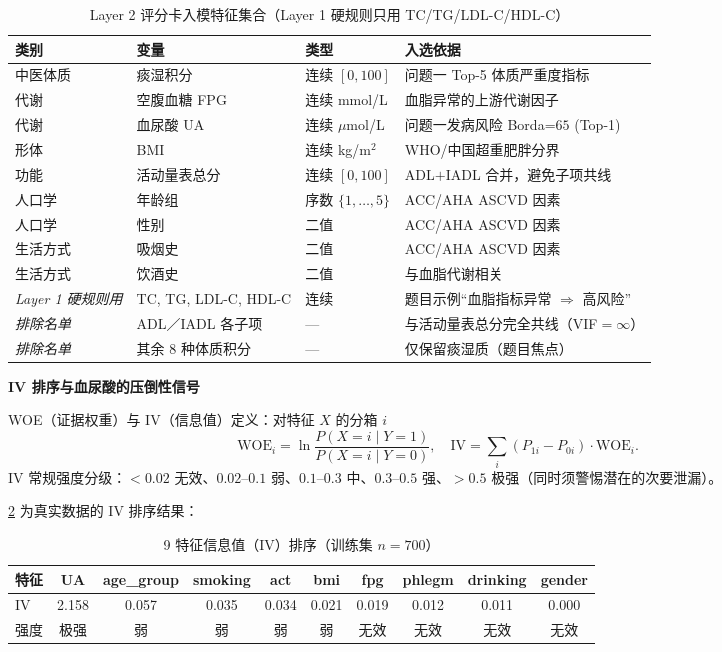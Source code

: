 \documentclass{MathorCupmodeling}
\begin{document}
\begin{table}[H]
\centering\small
\caption{Layer 2 评分卡入模特征集合（Layer 1 硬规则只用 TC/TG/LDL-C/HDL-C）}\label{tab:q2-features}
\begin{tabular}{@{}l l l l@{}}
\toprule
类别 & 变量 & 类型 & 入选依据 \\
\midrule
中医体质 & 痰湿积分 & 连续 $[0,100]$ & 问题一 Top-5 体质严重度指标 \\
代谢 & 空腹血糖 FPG & 连续 mmol/L & 血脂异常的上游代谢因子 \\
代谢 & 血尿酸 UA & 连续 $\mu$mol/L & 问题一发病风险 Borda=$65$ (Top-1) \\
形体 & BMI & 连续 kg/m$^2$ & WHO/中国超重肥胖分界 \\
功能 & 活动量表总分 & 连续 $[0,100]$ & ADL$+$IADL 合并，避免子项共线 \\
人口学 & 年龄组 & 序数 $\{1,\dots,5\}$ & ACC/AHA ASCVD 因素\cite{goff2014} \\
人口学 & 性别 & 二值 & ACC/AHA ASCVD 因素 \\
生活方式 & 吸烟史 & 二值 & ACC/AHA ASCVD 因素 \\
生活方式 & 饮酒史 & 二值 & 与血脂代谢相关 \\
\midrule
\emph{Layer 1 硬规则用} & TC, TG, LDL-C, HDL-C & 连续 & 题目示例``血脂指标异常 $\Rightarrow$ 高风险''\\
\emph{排除名单} & ADL／IADL 各子项 & --- & 与活动量表总分完全共线（VIF$=\infty$） \\
\emph{排除名单} & 其余 $8$ 种体质积分 & --- & 仅保留痰湿质（题目焦点） \\
\bottomrule
\end{tabular}
\end{table}

\noindent\textbf{IV 排序与血尿酸的压倒性信号}

WOE（证据权重）与 IV（信息值）定义\cite{siddiqi2006credit}：对特征 $X$ 的分箱 $i$
$$\mathrm{WOE}_i=\ln\!\frac{P(X{=}i\mid Y{=}1)}{P(X{=}i\mid Y{=}0)},\quad \mathrm{IV}=\sum_i(P_{1i}-P_{0i})\cdot\mathrm{WOE}_i.$$
IV 常规强度分级：$<0.02$ 无效、$0.02\text{--}0.1$ 弱、$0.1\text{--}0.3$ 中、$0.3\text{--}0.5$ 强、$>0.5$ 极强（同时须警惕潜在的次要泄漏）。

\cref{tab:q2-iv} 为真实数据的 IV 排序结果：

\begin{table}[H]
\centering\small
\caption{9 特征信息值（IV）排序（训练集 $n=700$）}\label{tab:q2-iv}
\begin{tabular}{@{}l c c c c c c c c c@{}}
\toprule
特征 & UA & age\_group & smoking & act & bmi & fpg & phlegm & drinking & gender \\
\midrule
IV & 2.158 & 0.057 & 0.035 & 0.034 & 0.021 & 0.019 & 0.012 & 0.011 & 0.000 \\
强度 & 极强 & 弱 & 弱 & 弱 & 弱 & 无效 & 无效 & 无效 & 无效 \\
\bottomrule
\end{tabular}
\end{table}
\end{document}
